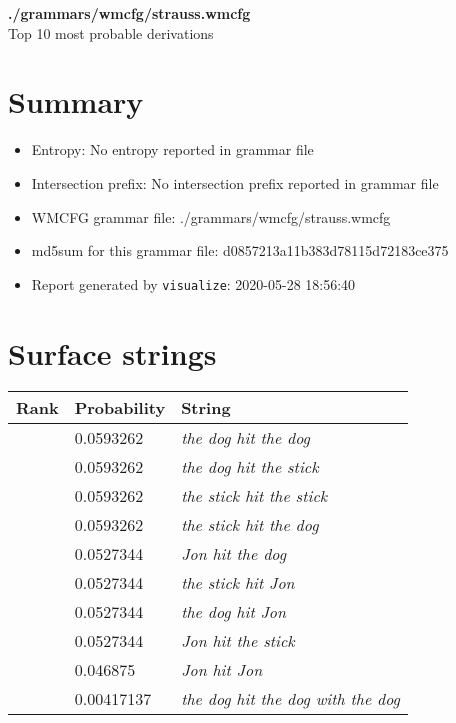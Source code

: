 \documentclass[11pt]{article}
\begin{document}
\begin{center}
{\huge \textbf{./grammars/wmcfg/strauss.wmcfg}} \\[0.5em]
{\normalsize Top 10 most probable derivations}
\end{center}

\section{Summary}
\begin{itemize}
	\item Entropy: No entropy reported in grammar file
	\item Intersection prefix: No intersection prefix reported in grammar file
	\item WMCFG grammar file: ./grammars/wmcfg/strauss.wmcfg
	\item md5sum for this grammar file: d0857213a11b383d78115d72183ce375
	\item Report generated by \texttt{visualize}: 2020-05-28 18:56:40
\end{itemize}

\section{Surface strings}
\hspace{1em}
\renewcommand{\arraystretch}{1.15}
\newcommand\rownumber{\stepcounter{rownumber}\arabic{rownumber}}
\begin{tabular}{l l l}
	\hline
	 Rank & Probability & String \\
	\hline
\rownumber & 0.0593262 & \textit{the dog hit the dog} \\
\rownumber & 0.0593262 & \textit{the dog hit the stick} \\
\rownumber & 0.0593262 & \textit{the stick hit the stick} \\
\rownumber & 0.0593262 & \textit{the stick hit the dog} \\
\rownumber & 0.0527344 & \textit{Jon hit the dog} \\
\rownumber & 0.0527344 & \textit{the stick hit Jon} \\
\rownumber & 0.0527344 & \textit{the dog hit Jon} \\
\rownumber & 0.0527344 & \textit{Jon hit the stick} \\
\rownumber & 0.046875 & \textit{Jon hit Jon} \\
\rownumber & 0.00417137 & \textit{the dog hit the dog with the dog} \\
	\hline
\end{tabular}
\end{document}
